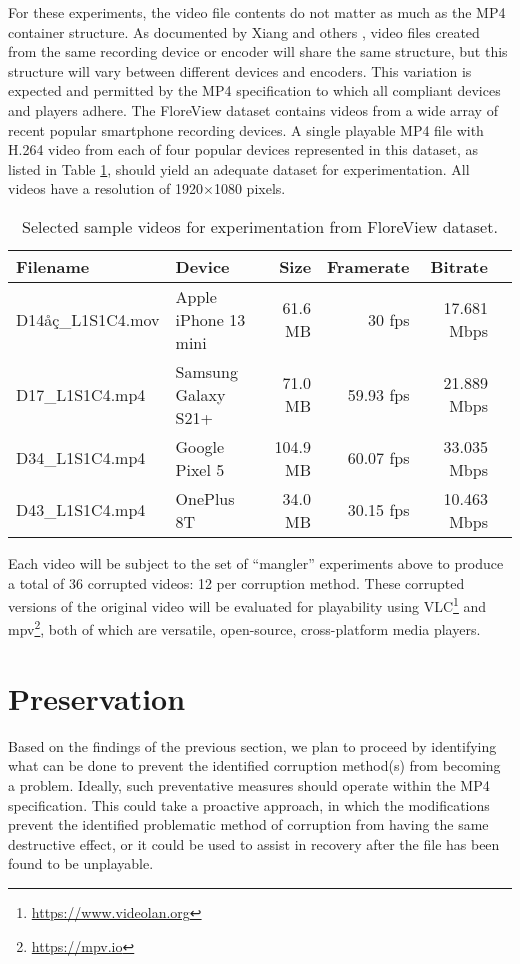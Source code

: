 For these experiments, the video file contents do not matter as much as the MP4 container structure. As documented by Xiang and others \cite{xiang2021} \cite{xiang2023} \cite{gloe2014}, video files created from the same recording device or encoder will share the same structure, but this structure will vary between different devices and encoders. This variation is expected and permitted by the MP4 specification to which all compliant devices and players adhere. The FloreView dataset \cite{baracchi2023} contains videos from a wide array of recent popular smartphone recording devices. A single playable MP4 file with H.264 video from each of four popular devices represented in this dataset, as listed in Table \ref{tab:sample-videos}, should yield an adequate dataset for experimentation. All videos have a resolution of 1920$\times$1080 pixels.

\begin{table}[h!]
    \centering
    \begin{tabular}{|l|l|r|r|r|r|}
        \hline
        Filename & Device & Size & Framerate & Bitrate\\
        \hline\hline
        {D14åç\_L1S1C4.mov} & Apple iPhone 13 mini & 61.6 MB & 30 fps & 17.681 Mbps \\
        {D17\_L1S1C4.mp4} & Samsung Galaxy S21+ & 71.0 MB & 59.93 fps & 21.889 Mbps \\
        {D34\_L1S1C4.mp4} & Google Pixel 5 & 104.9 MB & 60.07 fps & 33.035 Mbps \\
        {D43\_L1S1C4.mp4} & OnePlus 8T & 34.0 MB & 30.15 fps & 10.463 Mbps \\
        \hline
    \end{tabular}
    \caption{Selected sample videos for experimentation from FloreView dataset.}
    \label{tab:sample-videos}
\end{table}

Each video will be subject to the set of ``mangler'' experiments above to produce a total of 36 corrupted videos: 12 per corruption method. These corrupted versions of the original video will be evaluated for playability using VLC\footnote{\url{https://www.videolan.org}} and mpv\footnote{\url{https://mpv.io}}, both of which are versatile, open-source, cross-platform media players.

\section{Preservation}

Based on the findings of the previous section, we plan to proceed by identifying what can be done to prevent the identified corruption method(s) from becoming a problem. Ideally, such preventative measures should operate within the MP4 specification. This could take a proactive approach, in which the modifications prevent the identified problematic method of corruption from having the same destructive effect, or it could be used to assist in recovery after the file has been found to be unplayable.

